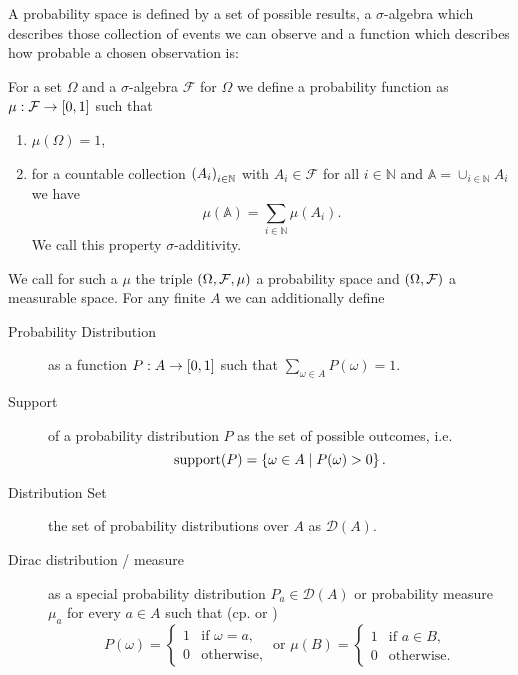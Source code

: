 A probability space is defined by a set of possible results, a $\sigma$-algebra
which describes those collection of events we can observe and a function which
describes how probable a chosen observation is:
\begin{definition}
  For a set $\Omega$ and a $\sigma$-algebra $\mathcal{F}$ for $\Omega$ we
  define a probability function as $\mu:\mathcal{F}\rightarrow\left[0,1\right]$
  such that
  \begin{enumerate}
    \item $\mu(\Omega) = 1$,
    \item for a countable collection $\left(A_{i}\right)_{i\in\mathbb{N}}$ with
      $A_{i}\in\mathcal{F}$ for all $i\in\mathbb{N}$ and 
      $\mathbb{A} = \cup_{i\in\mathbb{N}}A_{i}$ we have
      \begin{equation*}
        \mu(\mathbb{A}) = \sum_{i\in\mathbb{N}}\mu(A_{i}).
      \end{equation*}
      We call this property $\sigma$-additivity.
  \end{enumerate}
  We call for such a $\mu$ the triple $\left(\Omega,\mathcal{F},\mu\right)$ a 
  probability space and $\left(\Omega, \mathcal{F}\right)$ a measurable space. For
  any finite $A$ we can additionally define
  \begin{description}
    \item [Probability Distribution] as a function
      $P:A\rightarrow\left[0,1\right]$ such that
      $\sum_{\omega\in A}P(\omega) = 1$.
    \item [Support] of a probability distribution $P$ as the set of possible
      outcomes, i.e.
      \begin{equation*}
        \operatorname{support}(P) = \left\{\omega\in A\mid P(\omega) > 0\right\}.
      \end{equation*}
    \item [Distribution Set] the set of probability distributions over $A$ as
      $\mathcal{D}(A)$.
    \item [Dirac distribution / measure] as a special probability distribution 
      $P_{a}\in\mathcal{D}(A)$ or probability measure $\mu_{a}$ for every 
      $a\in A$ such that (cp. \cite[Example 1.30]{Klenke} or \cite{POSG})
      \begin{equation*}
        P(\omega) = \begin{cases}
          1&\text{if }\omega = a,\\
          0&\text{otherwise},
        \end{cases}
        \text{ or }
        \mu(B) = \begin{cases}
          1&\text{if }a\in B,\\
          0&\text{otherwise}.
        \end{cases}
      \end{equation*}
  \end{description}
\end{definition}
